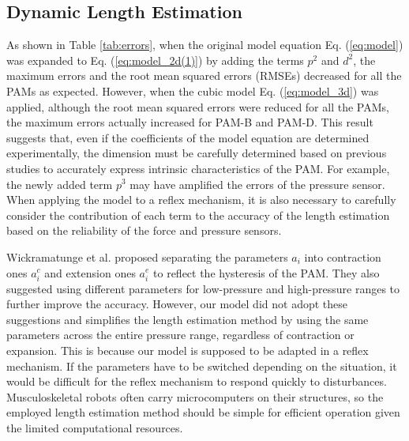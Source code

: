 \subsection{Dynamic Length Estimation}
As shown in Table \ref{tab:errors}, when the original model equation Eq. (\ref{eq:model}) was expanded to Eq. (\ref{eq:model_2d(1)}) by adding the terms $p^2$ and $d^2$, the maximum errors and the root mean squared errors (RMSEs) decreased for all the PAMs as expected. However, when the cubic model Eq. (\ref{eq:model_3d}) was applied, although the root mean squared errors were reduced for all the PAMs, the maximum errors actually increased for PAM-B and PAM-D. This result suggests that, even if the coefficients of the model equation are determined experimentally, the dimension must be carefully determined based on previous studies to accurately express intrinsic characteristics of the PAM. For example, the newly added term $p^3$ may have amplified the errors of the pressure sensor. When applying the model to a reflex mechanism, it is also necessary to carefully consider the contribution of each term to the accuracy of the length estimation based on the reliability of the force and pressure sensors.

Wickramatunge et al. proposed separating the parameters $a_i$ into contraction ones $a^c_i$ and extension ones $a^e_i$ to reflect the hysteresis of the PAM\cite{spring}. They also suggested using different parameters for low-pressure and high-pressure ranges to further improve the accuracy. However, our model did not adopt these suggestions and simplifies the length estimation method by using the same parameters across the entire pressure range, regardless of contraction or expansion. This is because our model is supposed to be adapted in a reflex mechanism. If the parameters have to be switched depending on the situation, it would be difficult for the reflex mechanism to respond quickly to disturbances. Musculoskeletal robots often carry microcomputers on their structures, so the employed length estimation method should be simple for efficient operation given the limited computational resources.

